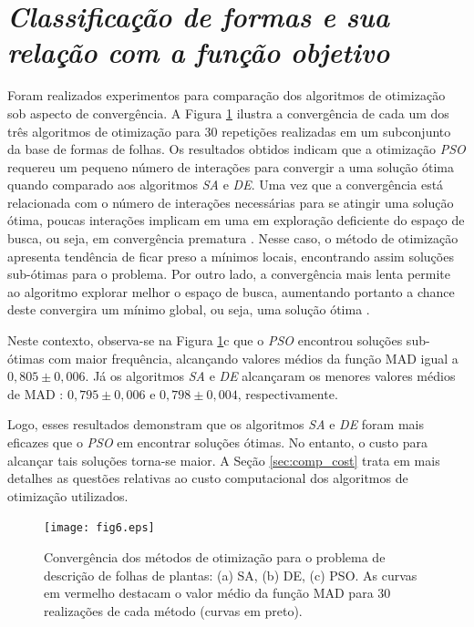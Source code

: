 {\color{blue}

\section{\emph{Classificação de formas e sua relação com  a função objetivo}}
Foram realizados experimentos para comparação dos algoritmos de otimização sob aspecto de convergência. A Figura \ref{fig:converge} ilustra a convergência de cada um dos três algoritmos de otimização para $30$ repetições realizadas em um subconjunto da base de formas de folhas. Os resultados obtidos indicam que a otimização \emph{PSO} requereu um pequeno número de interações para convergir a uma solução ótima quando comparado aos algoritmos \emph{SA} e \emph{DE}. Uma vez que a convergência está relacionada com o número de interações necessárias para se atingir uma solução ótima, poucas interações implicam em uma em exploração deficiente do espaço de busca, ou seja, em convergência prematura . Nesse caso, o método de otimização apresenta tendência de ficar preso a mínimos locais, encontrando assim soluções sub-ótimas para o problema. Por outro lado, a convergência mais lenta permite ao algoritmo explorar melhor o espaço de busca, aumentando portanto a chance deste convergira um mínimo global, ou seja, uma solução ótima .
 
Neste contexto, observa-se na Figura \ref{fig:converge}c que o \emph{PSO} encontrou soluções sub-ótimas com maior frequência, alcançando valores médios da função MAD  igual a $0,805 \pm 0,006$.  Já os algoritmos \emph{SA} e \emph{DE} alcançaram os menores valores médios de MAD : $0,795 \pm 0,006$ e $0,798 \pm 0,004$, respectivamente. 

Logo, esses resultados demonstram que os algoritmos \emph{SA} e \emph{DE} foram mais eficazes que o \emph{PSO} em encontrar soluções ótimas. No entanto, o custo para alcançar tais soluções torna-se maior. A Seção \ref{sec:comp_cost} trata em mais detalhes as questões relativas ao custo computacional dos algoritmos de otimização utilizados.

\begin{figure}[!htb]
\caption{\label{fig:converge} Convergência dos métodos de otimização para o problema de descrição de folhas de plantas: (a) SA, (b) DE, (c) PSO. As curvas em vermelho destacam o valor médio da função MAD para $30$ realizações de cada método (curvas em preto). }
\texttt{[image: fig6.eps]}
\end{figure}

}
